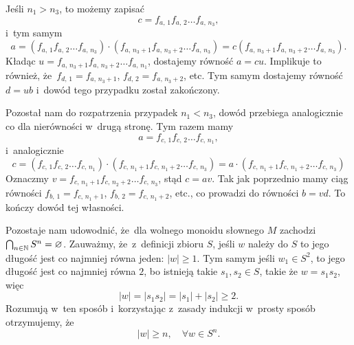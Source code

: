 \documentclass[a4paper,11pt]{article}
\begin{document}
Jeśli $n_{ 1 } > n_{ 3 }$, to możemy zapisać
\begin{equation}
  \label{eq:Forys-Forys-33}
  c = f_{ a,\, 1 } f_{ a,\, 2 } \ldots f_{ a,\, n_{ 3 } },
\end{equation}
i~tym samym
\begin{equation}
  \label{eq:Forys-Forys-34}
  a =
  ( f_{ a,\, 1 } f_{ a,\, 2 } \ldots f_{ a,\, n_{ 3 } } ) \cdot ( f_{ a,\, n_{ 3 } + 1 }
  f_{ a,\, n_{ 3 } + 2 } \ldots f_{ a,\, n_{ 3 } } )
  =
  c ( f_{ a,\, n_{ 3 } + 1 } f_{ a,\, n_{ 3 } + 2 } \ldots f_{ a,\, n_{ 3 } } ).
\end{equation}
Kładąc $u = f_{ a,\, n_{ 3 } + 1 } f_{ a,\, n_{ 3 } + 2 } \ldots f_{ a,\, n_{ 1 } }$,
dostajemy równość $a = cu$. Implikuje to również,
że~$f_{ d,\, 1 } = f_{ a,\, n_{ 3 } + 1 }$, $f_{ d,\, 2 } = f_{ a,\, n_{ 3 } + 2 }$,
etc. Tym samym dostajemy równość $d = ub$ i~dowód tego przypadku został
zakończony.

Pozostał nam do rozpatrzenia przypadek $n_{ 1 } < n_{ 3 }$, dowód przebiega
analogicznie co dla nierówności w~drugą stronę. Tym razem mamy
\begin{equation}
  \label{eq:Forys-Forys-35}
  a = f_{ c,\, 1 } f_{ c,\, 2 } \ldots f_{ c,\, n_{ 1 } },
\end{equation}
i~analogicznie
\begin{equation}
  \label{eq:Forys-Forys-36}
  c =
  ( f_{ c,\, 1 } f_{ c,\, 2 } \ldots f_{ c,\, n_{ 1 } })
  \cdot ( f_{ c,\, n_{ 1 } + 1 } f_{ c,\, n_{ 1 } + 2 } \ldots f_{ c,\, n_{ 3 } } )
  =
  a \cdot ( f_{ c,\, n_{ 1 } + 1 } f_{ c,\, n_{ 1 } + 2 } \ldots f_{ c,\, n_{ 3 } } )
\end{equation}
Oznaczmy $v = f_{ c,\, n_{ 1 } + 1 } f_{ c,\, n_{ 2 } + 2 } \ldots f_{ c,\, n_{ 3 } }$,
stąd $c = a v$. Tak jak poprzednio mamy ciąg równości
$f_{ b,\, 1 } = f_{ c,\, n_{ 1 } + 1 }$, $f_{ b,\, 2 } = f_{ c,\, n_{ 1 } + 2 }$, etc.,
co prowadzi do równości $b = v d$. To kończy dowód tej własności.

Pozostaje nam udowodnić, że~dla wolnego monoidu słownego $M$ zachodzi
$\bigcap_{ n \in \mathbb{N} } S^{ n } = \varnothing$. Zauważmy, że~z~definicji zbioru $S$, jeśli $w$
należy do $S$ to jego długość jest co najmniej równa jeden: $| w | \geq 1$. Tym
samym jeśli $w_{ 1 } \in S^{ 2 }$, to jego długość jest co najmniej równa $2$, bo istnieją takie $s_{ 1 }, s_{ 2 } \in S$, takie że $w = s_{ 1 } s_{ 2 }$, więc
\begin{equation}
  \label{eq:Forys-Forys-37}
  | w | = | s_{ 1 } s_{ 2 } | = | s_{ 1 } | + | s_{ 2 } | \geq 2.
\end{equation}
Rozumują w~ten sposób i~korzystając z~zasady indukcji w~prosty sposób otrzymujemy, że
\begin{equation}
  \label{eq:Forys-Forys-38}
  | w | \geq n, \quad \forall w \in S^{ n }.
\end{equation}
\end{document}
